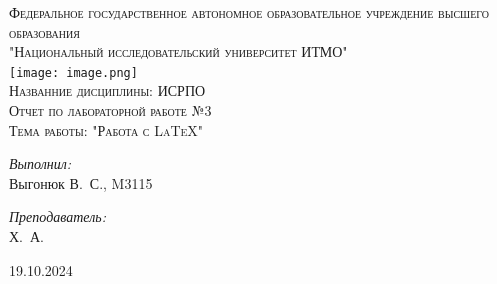 \begin{titlepage}
\begin{center}

\textsc{\Large Федеральное государственное автономное образовательное учреждение высшего образования}\\
\textsc{\large "Национальный исследовательский университет ИТМО"}\\[0.5cm]

\texttt{[image: image.png]}~\\[0.5cm]

\textsc{\Large Названние дисциплины: ИСРПО 
\\ Отчет по лабораторной работе №3
\\ Тема работы: "Работа с LaTeX"}
\\[5cm]


\noindent
\begin{minipage}{0.4\textwidth}
\begin{flushleft} \large
\emph{Выполнил:}\\
Выгонюк \textsc{В.~С.}, M3115
\end{flushleft}
\end{minipage}
\begin{minipage}{0.4\textwidth}
\begin{flushright} \large
\emph{Преподаватель:}\\
\quad\quad{} \textsc{Х.~А.}
\end{flushright}
\end{minipage}

\vfill

{\large 19.10.2024}

\end{center}
\end{titlepage}